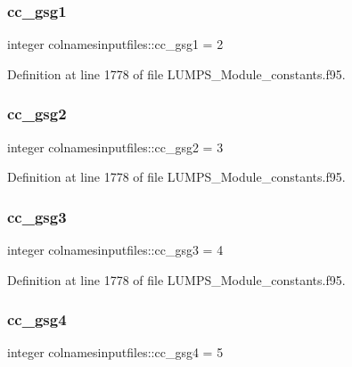 \subsubsection{\texorpdfstring{cc\+\_\+gsg1}{cc\_gsg1}}
{\footnotesize\ttfamily integer colnamesinputfiles\+::cc\+\_\+gsg1 = 2}



Definition at line 1778 of file L\+U\+M\+P\+S\+\_\+\+Module\+\_\+constants.\+f95.

\mbox{\label{namespacecolnamesinputfiles_a614110f82a823e6142965db6efb55168}} 
\subsubsection{\texorpdfstring{cc\+\_\+gsg2}{cc\_gsg2}}
{\footnotesize\ttfamily integer colnamesinputfiles\+::cc\+\_\+gsg2 = 3}



Definition at line 1778 of file L\+U\+M\+P\+S\+\_\+\+Module\+\_\+constants.\+f95.

\mbox{\label{namespacecolnamesinputfiles_a1a8c73a721f0366e832c7786efdc3941}} 
\subsubsection{\texorpdfstring{cc\+\_\+gsg3}{cc\_gsg3}}
{\footnotesize\ttfamily integer colnamesinputfiles\+::cc\+\_\+gsg3 = 4}



Definition at line 1778 of file L\+U\+M\+P\+S\+\_\+\+Module\+\_\+constants.\+f95.

\mbox{\label{namespacecolnamesinputfiles_ab4b1e0fe0864334d7bcb1e4b07c3107f}} 
\subsubsection{\texorpdfstring{cc\+\_\+gsg4}{cc\_gsg4}}
{\footnotesize\ttfamily integer colnamesinputfiles\+::cc\+\_\+gsg4 = 5}



